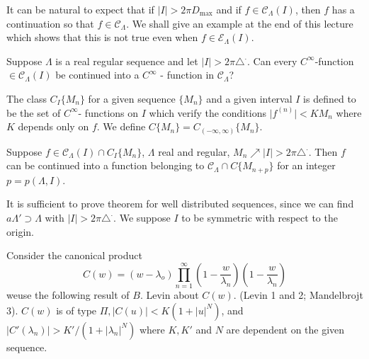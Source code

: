 It can be natural to expect that if $\big | I \big | > 2 \pi D_{\max}
$ and if $f \in \mathscr{C}_\Lambda(I)$, then $f$ has a continuation so that
$f \in \mathscr{C}_\Lambda$. We shall give an example at the end of
this lecture which shows that this is not true even when $f \in
\mathscr{E}_\Lambda (I)$. 

Suppose $\Lambda$ is a real regular sequence and let $\big | I \big |
> 2 \pi \triangle^. $. Can every $C^\infty$-function $\in
\mathscr{C}_\Lambda (I)$ be continued into a $C^\infty$ - function in
$\mathscr{C}_\Lambda$? 

\begin{defi*} %
  The class $C_I \big \{ M_n\big\}$ for a given sequence $\big \{
  M_n\big\}$ and a given interval $I$ is defined to be the set of
  $C^\infty$- functions on $I$ which verify the conditions $\big |
  f^{(n)} \big | < K M_n$ where $K$ depends only on $f$. We define $ C
  \big \{ M_n\big\} = C_{(- \infty, \infty)} \big \{ M_n\big\}$. 
\end{defi*}

\begin{theorem*} %
 Suppose $f \in \mathscr{C}_\Lambda (I) \cap C_I \big \{ M_n\big\}$,
 $\Lambda$ real and regular, $M_n \nearrow | I | > 2 \pi
 \triangle^.$. Then $f$ can be continued into a function belonging to
 $\mathscr{C}_\Lambda \cap C\big \{ M_{n + p}\big\}$ for an integer
 $p = p(\Lambda, I)$. 
\end{theorem*}

It is sufficient to prove theorem for well distributed sequences,
since we can find $a \Lambda' \supset \Lambda$ with $| I | > 2 \pi
\triangle^.$. We suppose $I$ to be symmetric with respect to the
origin. 

Consider the canonical product
$$
C(w) = (w - \lambda_o ) \prod^\infty_{n = 1} \left(1- \frac{w}{\lambda_n}\right)
\left( 1 - \frac{w}{\lambda_n}\right) 
$$
we\pageoriginale use the following result of $B$. Levin about $C(w)$. (Levin 1
and 2; Mandelbrojt 3). $C(w)$ is of type $\Pi, | C (u) | < K (1+ |
u |^N)$, and $\big | C' (\lambda_n) \big | > K' / (1+ |\lambda_n|^N)$
where $K, K'$ and $N$ are dependent on the given sequence. 

